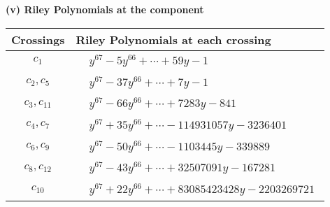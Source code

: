 \documentclass[1p]{elsarticle_modified}
\theoremstyle{definition}
\begin{document}
\flushleft \textbf{(v) Riley Polynomials at the component}\newline \\
\begin{tabular}{m{50pt}|m{274pt}}
Crossings & \hspace{64pt}Riley Polynomials at each crossing \\
\hline $$\begin{aligned}c_{1}\end{aligned}$$&$\begin{aligned}
&y^{67}-5 y^{66}+\cdots+59 y-1
\end{aligned}$\\
\hline $$\begin{aligned}c_{2},c_{5}\end{aligned}$$&$\begin{aligned}
&y^{67}-37 y^{66}+\cdots+7 y-1
\end{aligned}$\\
\hline $$\begin{aligned}c_{3},c_{11}\end{aligned}$$&$\begin{aligned}
&y^{67}-66 y^{66}+\cdots+7283 y-841
\end{aligned}$\\
\hline $$\begin{aligned}c_{4},c_{7}\end{aligned}$$&$\begin{aligned}
&y^{67}+35 y^{66}+\cdots-114931057 y-3236401
\end{aligned}$\\
\hline $$\begin{aligned}c_{6},c_{9}\end{aligned}$$&$\begin{aligned}
&y^{67}-50 y^{66}+\cdots-1103445 y-339889
\end{aligned}$\\
\hline $$\begin{aligned}c_{8},c_{12}\end{aligned}$$&$\begin{aligned}
&y^{67}-43 y^{66}+\cdots+32507091 y-167281
\end{aligned}$\\
\hline $$\begin{aligned}c_{10}\end{aligned}$$&$\begin{aligned}
&y^{67}+22 y^{66}+\cdots+83085423428 y-2203269721
\end{aligned}$\\
\hline
\end{tabular}\\~\\
\end{document}
